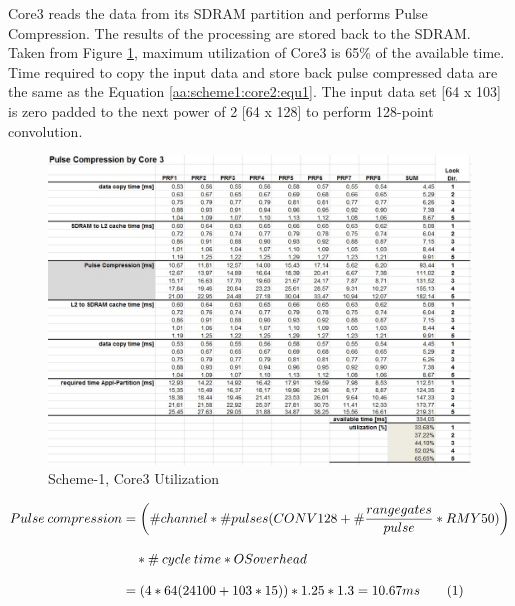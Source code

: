 Core3 reads the data from its SDRAM partition and performs Pulse Compression. The results of the processing are stored back to the SDRAM. Taken from Figure \ref{fig:existing_analysis:aa_scheme1_cpu_util3}, maximum utilization of Core3 is 65\% of the available time. Time required to copy the input data and store back pulse compressed data are the same as the Equation \ref{aa:scheme1:core2:equ1}. The input data set [64 x 103] is zero padded to the next power of 2 [64 x 128] to perform 128-point convolution.
\begin{figure}[h!]
	\centering
	\includegraphics[width=160mm]{figures/aa_scheme1_cpu_util_3}
	\caption{Scheme-1, Core3 Utilization}
	\label{fig:existing_analysis:aa_scheme1_cpu_util3}
\end{figure}
\begin{align*}
	\label{aa:scheme1:core3:equ}
	Pulse \: compression &= \bigg(\#channel * \#pulses (CONV128 +  \# \frac{range gates}{pulse} * RMY50)\bigg)\\[0.3cm]  
	& \quad * \# \: cycle \: time * OSoverhead\\[0.3cm] 
	&= (4 * 64 (24100 + 103 * 15)) * 1.25 * 1.3 = 10.67ms   \stepcounter{equation}\tag{\theequation} 
\end{align*}

